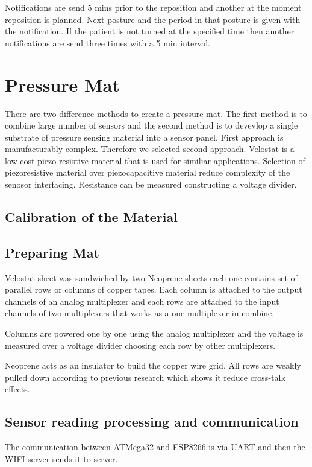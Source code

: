 Notifications are  send 5  mins prior to the reposition and another at the moment reposition is planned. Next posture and the period in that posture is given with the notification. If the patient is not turned at the specified time then another notifications are send three times with a 5 min interval.


\section{Pressure Mat}

There are two difference methods to create a pressure mat. The first method is to combine large number of sensors and the second method is to devevlop a single substrate of pressure sensing material into a sensor panel. First approach is manufacturably complex. Therefore we selected second approach. Velostat\textsuperscript{\textregistered} is a low cost piezo-resistive material that is used for similiar applications. Selection of piezoresistive material over piezocapacitive material reduce complexity of the senosor interfacing. Resistance can be measured constructing a voltage divider. 

\subsection{Calibration of the Material}





\subsection{Preparing Mat}

Velostat sheet was sandwiched by two Neoprene sheets each one contains set of parallel rows or columns of copper tapes. Each column is attached to the output channels of an analog multiplexer and each rows are attached to the input channels of two multiplexers that works as a one multiplexer in combine. 



Columns are powered one by one using the analog multiplexer and the voltage is measured over a voltage divider choosing each row by other multiplexers. 

Neoprene acts as an insulator to build the copper wire grid. All rows are weakly pulled down according to previous research which shows it reduce cross-talk effects.

\subsection{Sensor reading processing and communication}
The communication between ATMega32 and ESP8266 is via UART and then the WIFI server sends it to server. 






